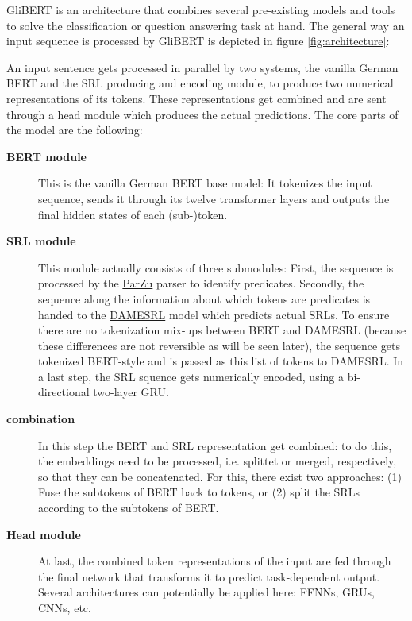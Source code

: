 GliBERT is an architecture that combines several pre-existing models and
tools to solve the classification or question answering task at hand. The
general way an input sequence is processed by GliBERT is depicted in figure
\ref{fig:architecture}:



An input sentence gets processed in parallel by two systems, the vanilla German BERT
and the SRL producing and encoding module, to produce two numerical representations
of its tokens. These representations get combined and are sent through a head module
which produces the actual predictions. The core parts of the model are the following:

\begin{description}
	\item[\textbf{BERT module}] This is the vanilla German BERT base model: It tokenizes the input sequence, sends it through its twelve transformer layers and outputs the final hidden states of each (sub-)token.
  \item[\textbf{SRL module}] This module actually consists of three submodules: First, the sequence is processed by the \href{https://github.com/rsennrich/ParZu}{ParZu} \citep{sennrich2009new} parser to identify predicates.
	Secondly, the sequence along the information about which tokens are predicates is handed to the \href{https://liir.cs.kuleuven.be/software_pages/damesrl.php}{DAMESRL} model \citep{do2018flexible} which predicts actual SRLs.
	To ensure there are no tokenization mix-ups between BERT and DAMESRL (because these differences are not reversible as will be seen later), the sequence gets tokenized BERT-style and is passed as this list of tokens to DAMESRL. In a last step,
	the SRL squence gets numerically encoded, using a bi-directional two-layer GRU.
  \item[\textbf{combination}] In this step the BERT and SRL representation get combined: to do this, the embeddings need to be processed, i.e. splittet or merged, respectively, so that they can be concatenated.
	For this, there exist two approaches:
	(1) Fuse the subtokens of BERT back to tokens, or (2) split the SRLs according to the subtokens of BERT.
  \item[\textbf{Head module}] At last, the combined token representations of the input are fed through the final network that transforms it to predict task-dependent output. Several architectures can potentially be applied here: FFNNs, GRUs, CNNs, etc.
\end{description}

